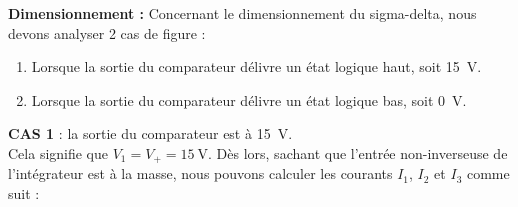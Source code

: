\documentclass[10pt, oneside, a4paper]{article}
\begin{document}
\noindent\textbf{Dimensionnement :} Concernant le dimensionnement du sigma-delta, nous devons analyser 2 cas de figure : 
\begin{enumerate}
    \item Lorsque la sortie du comparateur délivre un état logique haut, soit \SI{15}{\volt}.
    \item Lorsque la sortie du comparateur délivre un état logique bas, soit \SI{0}{\volt}.
\end{enumerate}
\vspace{1ex}
\noindent\textbf{CAS 1} : la sortie du comparateur est à \SI{15}{\volt}. \\
Cela signifie que $V_1 = V_+ = \SI{15}{\volt}$. Dès lors, sachant que l'entrée non-inverseuse de l'intégrateur est à la masse, nous pouvons calculer les courants $I_1$, $I_2$ et $I_3$ comme suit : 
\end{document}
